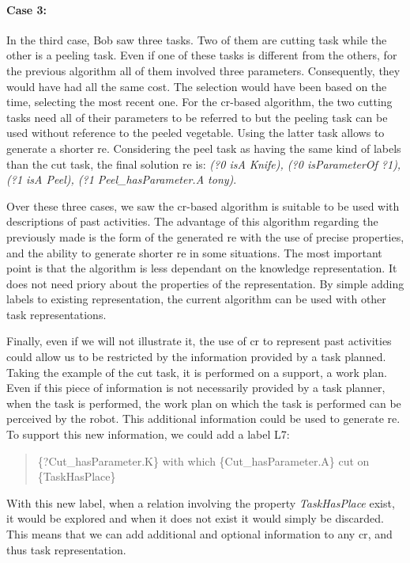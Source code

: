\paragraph{Case 3:} In the third case, Bob saw three tasks. Two of them are cutting task while the other is a peeling task. Even if one of these tasks is different from the others, for the previous algorithm all of them involved three parameters. Consequently, they would have had all the same cost. The selection would have been based on the time, selecting the most recent one. For the \acrshort{cr}-based algorithm, the two cutting tasks need all of their parameters to be referred to but the peeling task can be used without reference to the peeled vegetable. Using the latter task allows to generate a shorter \acrshort{re}. Considering the peel task as having the same kind of labels than the cut task, the final solution \acrshort{re} is: \textit{(?0 isA Knife), (?0 isParameterOf ?1), (?1 isA Peel), (?1 Peel\_hasParameter.A tony)}.

Over these three cases, we saw the \acrshort{cr}-based algorithm is suitable to be used with descriptions of past activities. The advantage of this algorithm regarding the previously made is the form of the generated \acrshort{re} with the use of precise properties, and the ability to generate shorter \acrshort{re} in some situations. The most important point is that the algorithm is less dependant on the knowledge representation. It does not need priory about the properties of the representation. By simple adding labels to existing representation, the current algorithm can be used with other task representations.

Finally, even if we will not illustrate it, the use of \acrshort{cr} to represent past activities could allow us to be restricted by the information provided by a task planned. Taking the example of the cut task, it is performed on a support, a work plan. Even if this piece of information is not necessarily provided by a task planner, when the task is performed, the work plan on which the task is performed can be perceived by the robot. This additional information could be used to generate \acrshort{re}. To support this new information, we could add a label L7:

\begin{quote} 
\centering 
\{?Cut\_hasParameter.K\} with which \{Cut\_hasParameter.A\} cut on \{TaskHasPlace\}
\end{quote}

With this new label, when a relation involving the property \textit{TaskHasPlace} exist, it would be explored and when it does not exist it would simply be discarded. This means that we can add additional and optional information to any \acrshort{cr}, and thus task representation.

